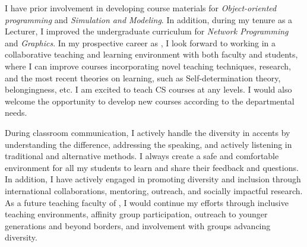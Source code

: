 \documentclass[11pt]{article}
\renewcommand*\paragraph[1]{}
\begin{document}
\paragraph{curriculum development for lecture and lab courses in Computer Science/Data Science}
I have prior involvement in developing course materials for \textit{Object-oriented programming} and \textit{Simulation and Modeling}. In addition, during my tenure as a Lecturer, I improved the undergraduate curriculum for \textit{Network Programming} and \textit{Graphics}.
In my prospective career as \PositionName{}, I look forward to working in a collaborative teaching and learning environment with both faculty and students, where I can improve courses incorporating novel teaching  techniques, research, and the most recent theories on learning, such as Self-determination theory, belongingness, etc. 
I am excited to teach CS courses at any levels.
I would also welcome the opportunity to develop new courses according to the departmental needs.

\paragraph{P4) The ability to contribute through teaching and/or service to the diversity, cultural sensitivity, and excellence of the academic community.}
\paragraph{Diversity}
During classroom communication, I actively handle the diversity in accents by understanding the difference, addressing the speaking, and actively listening in traditional and alternative methods.
I always create a safe and comfortable environment for all my students to learn and share their feedback and questions. In addition, I have actively engaged in promoting diversity and inclusion through international collaborations, mentoring, outreach, and socially impactful research. As a future teaching faculty of \shortInstitutionName{}, I would continue my efforts through inclusive teaching environments, affinity group participation, outreach to younger generations and beyond borders, and involvement with groups advancing diversity. 

\paragraph{P3) Relevant industrial experience beneficial to CS/ DS curriculum development and CS/DS capstone project advising}
\end{document}
